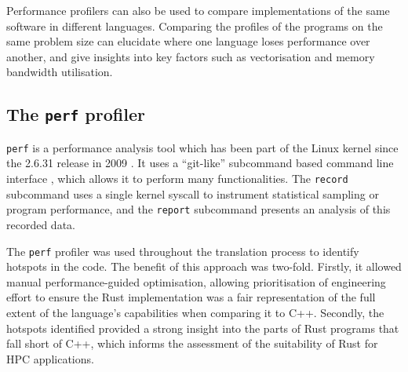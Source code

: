 Performance profilers can also be used to compare implementations of the same software in different languages. Comparing the  profiles of the programs on the same problem size can elucidate where one language loses performance over another, and give insights into key factors such as vectorisation and memory bandwidth utilisation.



\subsection{The \texttt{perf} profiler}
\label{ssec:perf-profiler}

\texttt{perf} is a performance analysis tool which has been part of the Linux kernel since the 2.6.31 release in 2009 \cite{PerfcountersAddedMainline}. It uses a ``git-like'' subcommand based command line interface  \cite{de2010new}, which allows it to perform many functionalities. The \texttt{record} subcommand uses a single kernel syscall to instrument statistical sampling or program performance, and the \texttt{report} subcommand presents an analysis of this recorded data.

The \texttt{perf} profiler was used throughout the translation process to identify hotspots in the code. The benefit of this approach was two-fold. Firstly, it allowed manual performance-guided optimisation, allowing prioritisation of engineering effort to ensure the Rust implementation was a fair representation of the full extent of the language's capabilities when comparing it to C++. Secondly, the hotspots identified provided a strong insight into the parts of Rust programs that fall short of C++, which informs the assessment of the suitability of Rust for \acrshort{HPC} applications.

